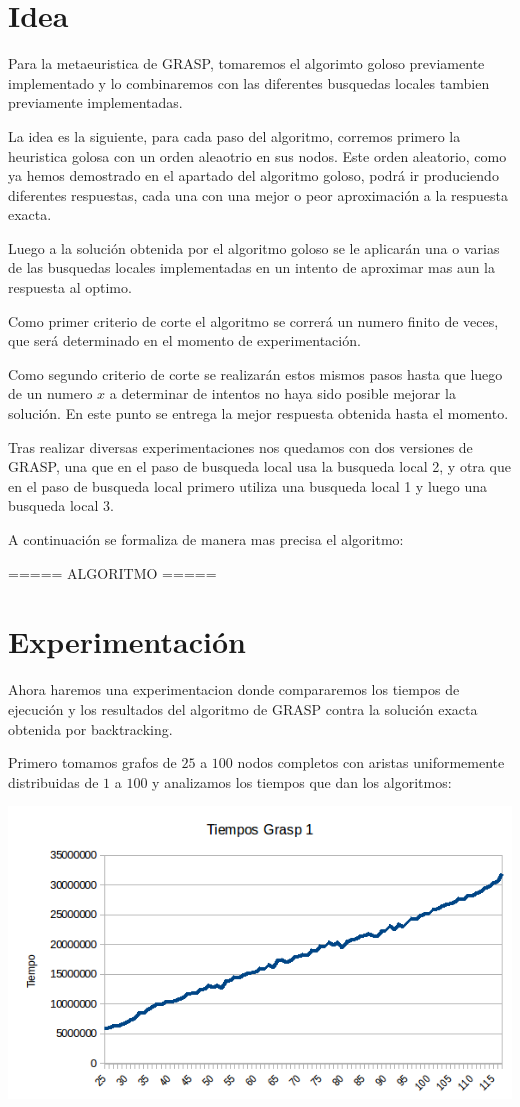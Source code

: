 \section{Idea}

Para la metaeuristica de GRASP, tomaremos el algorimto goloso previamente implementado y lo combinaremos con las diferentes busquedas locales tambien previamente implementadas.

La idea es la siguiente, para cada paso del algoritmo, corremos primero la heuristica golosa con un orden aleaotrio en sus nodos. Este orden aleatorio, como ya hemos demostrado en el apartado del algoritmo goloso, podrá ir produciendo diferentes respuestas, cada una con una mejor o peor aproximación a la respuesta exacta.

Luego a la solución obtenida por el algoritmo goloso se le aplicarán una o varias de las busquedas locales implementadas en un intento de aproximar mas aun la respuesta al optimo.

Como primer criterio de corte el algoritmo se correrá un numero finito de veces, que será determinado en el momento de experimentación.

Como segundo criterio de corte se realizarán estos mismos pasos hasta que luego de un numero $x$ a determinar de intentos no haya sido posible mejorar la solución. En este punto se entrega la mejor respuesta obtenida hasta el momento.

Tras realizar diversas experimentaciones nos quedamos con dos versiones de GRASP, una que en el paso de busqueda local usa la busqueda local 2, y otra que en el paso de busqueda local primero utiliza una busqueda local 1 y luego una busqueda local 3.

A continuación se formaliza de manera mas precisa el algoritmo:


===== ALGORITMO =====


\section{Experimentación}

Ahora haremos una experimentacion donde compararemos los tiempos de ejecución y los resultados del algoritmo de GRASP contra la solución exacta obtenida por backtracking.

Primero tomamos grafos de $25$ a $100$ nodos completos con aristas uniformemente distribuidas de $1$ a $100$ y analizamos los tiempos que dan los algoritmos:

\includegraphics[scale=0.5]{Ej5/tiempog1.png}

